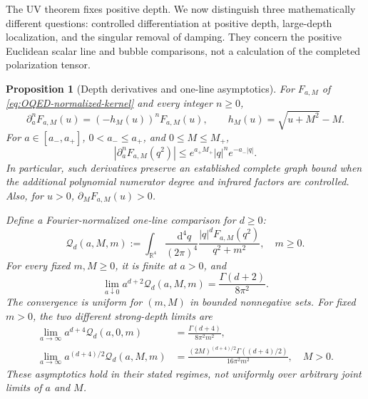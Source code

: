 \documentclass[final,5p,times,twocolumn,numbers,nopreprintline]{elsarticle}
\numberwithin{equation}{section}
\newtheorem{proposition}[theorem]{Proposition}
\theoremstyle{definition}
\theoremstyle{remark}
\newcommand{\dd}{\mathop{}\!\mathrm d}
\newcommand{\RR}{\mathbb R}
\begin{document}
The UV theorem fixes positive depth. We now distinguish three
mathematically different questions: controlled differentiation at
positive depth, large-depth localization, and the singular removal
of damping. They concern the
positive Euclidean scalar line and bubble comparisons, not a
calculation of the completed polarization tensor.

\begin{proposition}[Depth derivatives and one-line asymptotics]
\label{prop:OQED-depth-stability}
For $F_{a,M}$ of \eqref{eq:OQED-normalized-kernel} and every
integer $n\geq0$,
\begin{equation}
 \partial_a^nF_{a,M}(u)=(-h_M(u))^nF_{a,M}(u),\qquad
 h_M(u)=\sqrt{u+M^2}-M.
 \label{eq:OQED-depth-derivatives}
\end{equation}
For $a\in[a_-,a_+]$, $0<a_-\leq a_+$, and $0\leq M\leq M_+$,
\begin{equation}
 |\partial_a^nF_{a,M}(q^2)|
 \leq e^{a_+M_+}|q|^n e^{-a_-|q|}.
 \label{eq:OQED-depth-uniform-envelope}
\end{equation}
In particular, such derivatives preserve an established complete
graph bound when the additional polynomial numerator degree and
infrared factors are controlled. Also, for $u>0$,
$\partial_MF_{a,M}(u)>0$.

Define a Fourier-normalized one-line comparison for $d\geq0$:
\begin{equation}
 \mathscr Q_d(a,M,m)
 :=\int_{\RR^4}\frac{\dd^4q}{(2\pi)^4}
   \frac{|q|^dF_{a,M}(q^2)}{q^2+m^2},
 \quad m\geq0.
 \label{eq:OQED-one-line-depth}
\end{equation}
For every fixed $m,M\geq0$, it is finite at $a>0$, and
\begin{equation}
 \lim_{a\downarrow0}a^{d+2}\mathscr Q_d(a,M,m)
 =\frac{\Gamma(d+2)}{8\pi^2}.
 \label{eq:OQED-zero-depth-one-line}
\end{equation}
The convergence is uniform for $(m,M)$ in bounded nonnegative sets.
For fixed $m>0$, the two different strong-depth limits are
\begin{equation}
 \begin{aligned}
 \lim_{a\to\infty}a^{d+4}\mathscr Q_d(a,0,m)
   &=\frac{\Gamma(d+4)}{8\pi^2m^2},\\
 \lim_{a\to\infty}a^{(d+4)/2}\mathscr Q_d(a,M,m)
   &=\frac{(2M)^{(d+4)/2}\Gamma((d+4)/2)}
           {16\pi^2m^2},\quad M>0.
 \end{aligned}
 \label{eq:OQED-strong-depth-one-line}
\end{equation}
These asymptotics hold in their stated regimes, not uniformly over
arbitrary joint limits of $a$ and $M$.
\end{proposition}
\end{document}
